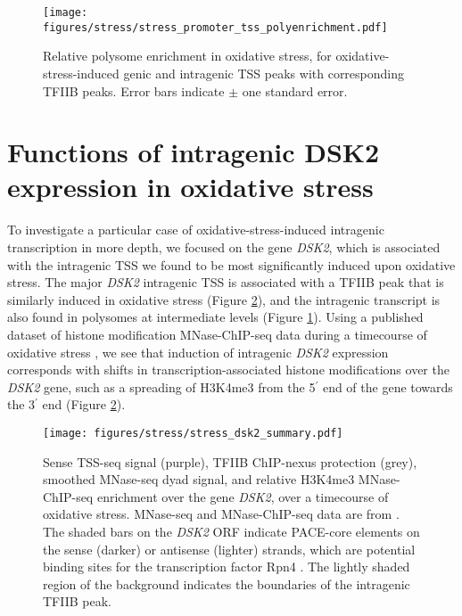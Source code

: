 \begin{figure}[h]
    \texttt{[image: figures/stress/stress\_promoter\_tss\_polyenrichment.pdf]}
    \caption[Relative polysome enrichment in oxidative stress, for oxidative-stress-induced genic and intragenic promoters.]{Relative polysome enrichment in oxidative stress, for oxidative-stress-induced genic and intragenic TSS peaks with corresponding TFIIB peaks. Error bars indicate $\pm$ one standard error.}
    \label{fig:stress_promoter_tss_polyenrichment}
\end{figure}

\section{Functions of intragenic DSK2 expression in oxidative stress}

To investigate a particular case of oxidative-stress-induced intragenic transcription in more depth, we focused on the gene \textit{DSK2}, which is associated with the intragenic TSS we found to be most significantly induced upon oxidative stress.
The major \textit{DSK2} intragenic TSS is associated with a TFIIB peak that is similarly induced in oxidative stress (Figure \ref{fig:stress_dsk2_summary}), and the intragenic transcript is also found in polysomes at intermediate levels (Figure \ref{fig:stress_promoter_tss_polyenrichment}).
Using a published dataset of histone modification MNase-ChIP-seq data during a timecourse of oxidative stress \citep{weiner2015}, we see that induction of intragenic \textit{DSK2} expression corresponds with shifts in transcription-associated histone modifications over the \textit{DSK2} gene, such as a spreading of H3K4me3 from the 5$^\prime$ end of the gene towards the 3$^\prime$ end (Figure \ref{fig:stress_dsk2_summary}).
\begin{figure}[h]
    \texttt{[image: figures/stress/stress\_dsk2\_summary.pdf]}
    \caption[Sense TSS-seq signal, TFIIB ChIP-nexus protection, and MNase-ChIP-seq data at the \textit{DSK2} gene, over an oxidative stress timecourse.]{Sense TSS-seq signal (purple), TFIIB ChIP-nexus protection (grey), smoothed MNase-seq dyad signal, and relative H3K4me3 MNase-ChIP-seq enrichment over the gene \textit{DSK2}, over a timecourse of oxidative stress. MNase-seq and MNase-ChIP-seq data are from \citet{weiner2015}. The shaded bars on the \textit{DSK2} ORF indicate PACE-core elements on the sense (darker) or antisense (lighter) strands, which are potential binding sites for the transcription factor Rpn4 \citep{shirozu2015}. The lightly shaded region of the background indicates the boundaries of the intragenic TFIIB peak.}
    \label{fig:stress_dsk2_summary}
\end{figure}

